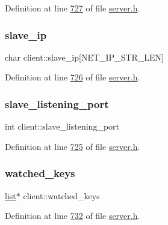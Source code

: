 Definition at line \hyperlink{server_8h_source_l00727}{727} of file \hyperlink{server_8h_source}{server.\+h}.

\mbox{\label{structclient_a1ef9e53d3be4457be63e9c76c8cf147c}} 
\subsubsection{\texorpdfstring{slave\+\_\+ip}{slave\_ip}}
{\footnotesize\ttfamily char client\+::slave\+\_\+ip\mbox{[}N\+E\+T\+\_\+\+I\+P\+\_\+\+S\+T\+R\+\_\+\+L\+EN\mbox{]}}



Definition at line \hyperlink{server_8h_source_l00726}{726} of file \hyperlink{server_8h_source}{server.\+h}.

\mbox{\label{structclient_a5f127070e4c759e60cdafef415f6eedb}} 
\subsubsection{\texorpdfstring{slave\+\_\+listening\+\_\+port}{slave\_listening\_port}}
{\footnotesize\ttfamily int client\+::slave\+\_\+listening\+\_\+port}



Definition at line \hyperlink{server_8h_source_l00725}{725} of file \hyperlink{server_8h_source}{server.\+h}.

\mbox{\label{structclient_a6a32880d8716dcdf732846d4b8ac977d}} 
\subsubsection{\texorpdfstring{watched\+\_\+keys}{watched\_keys}}
{\footnotesize\ttfamily \hyperlink{structlist}{list}$\ast$ client\+::watched\+\_\+keys}



Definition at line \hyperlink{server_8h_source_l00732}{732} of file \hyperlink{server_8h_source}{server.\+h}.

\mbox{\label{structclient_afe185dfb331a0a72943f14ab2df60a5d}} 
